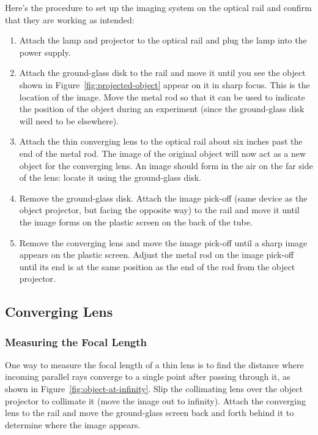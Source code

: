 \documentclass[]{manual}
\begin{document}
    Here's the procedure to set up the imaging system on the optical rail and confirm that they are working as intended:
    \begin{enumerate}
        \item Attach the lamp and projector to the optical rail and plug the lamp into the power supply.
        \item Attach the ground-glass disk to the rail and move it until you see the object shown in Figure~\ref{fig:projected-object} appear on it in sharp focus.
        This is the location of the image.
        Move the metal rod so that it can be used to indicate the position of the object during an experiment (since the ground-glass disk will need to be elsewhere).
        \item Attach the thin converging lens to the optical rail about six inches past the end of the metal rod.
        The image of the original object will now act as a new object for the converging lens.
        An image should form in the air on the far side of the lens: locate it using the ground-glass disk.
        \item Remove the ground-glass disk.
        Attach the image pick-off (same device as the object projector, but facing the opposite way) to the rail and move it until the image forms on the plastic screen on the back of the tube.
        \item Remove the converging lens and move the image pick-off until a sharp image appears on the plastic screen.
        Adjust the metal rod on the image pick-off until its end is at the same position as the end of the rod from the object projector.
    \end{enumerate}

    \subsection{Converging Lens}

    \subsubsection{Measuring the Focal Length}

    One way to measure the focal length of a thin lens is to find the distance where incoming parallel rays converge to a single point after passing through it, as shown in Figure~\ref{fig:object-at-infinity}.
    Slip the collimating lens over the object projector to collimate it (move the image out to infinity).
    Attach the converging lens to the rail and move the ground-glass screen back and forth behind it to determine where the image appears.
\end{document}

